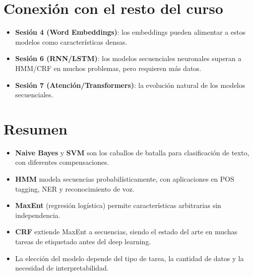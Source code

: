 \documentclass[12pt,a4paper,openany,oneside]{book}
\begin{document}
\section{Conexión con el resto del curso}
\begin{itemize}
    \item \textbf{Sesión 4 (Word Embeddings)}: los embeddings pueden alimentar a estos modelos como características densas.
    \item \textbf{Sesión 6 (RNN/LSTM)}: los modelos secuenciales neuronales superan a HMM/CRF en muchos problemas, pero requieren más datos.
    \item \textbf{Sesión 7 (Atención/Transformers)}: la evolución natural de los modelos secuenciales.
\end{itemize}

\section{Resumen}
\begin{itemize}
    \item \textbf{Naive Bayes} y \textbf{SVM} son los caballos de batalla para clasificación de texto, con diferentes compensaciones.
    \item \textbf{HMM} modela secuencias probabilísticamente, con aplicaciones en POS tagging, NER y reconocimiento de voz.
    \item \textbf{MaxEnt} (regresión logística) permite características arbitrarias sin independencia.
    \item \textbf{CRF} extiende MaxEnt a secuencias, siendo el estado del arte en muchas tareas de etiquetado antes del deep learning.
    \item La elección del modelo depende del tipo de tarea, la cantidad de datos y la necesidad de interpretabilidad.
\end{itemize}
\end{document}
